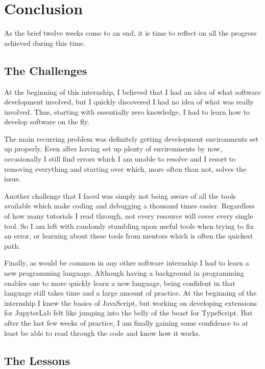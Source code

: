 \chapter{Conclusion}

    As the brief twelve weeks come to an end, it is time to reflect on all the progress achieved during this time. 


    \section*{The Challenges}

        At the beginning of this internship, I believed that I had an idea of what software development involved, but I quickly discovered I had no idea of what was really involved. Thus, starting with essentially zero knowledge, I had to learn how to develop software on the fly. 

        The main recurring problem was definitely getting development environments set up properly. Even after having set up plenty of environments by now, occasionally I still find errors which I am unable to resolve and I resort to removing everything and starting over which, more often than not, solves the issue.

        Another challenge that I faced was simply not being aware of all the tools available which make coding and debugging a thousand times easier. Regardless of how many tutorials I read through, not every resource will cover every single tool. So I am left with randomly stumbling upon useful tools when trying to fix an error, or learning about these tools from mentors which is often the quickest path.

        Finally, as would be common in any other software internship I had to learn a new programming language. Although having a background in programming enables one to more quickly learn a new language, being confident in that language still takes time and a large amount of practice. At the beginning of the internship I knew the basics of JavaScript, but working on developing extensions for JupyterLab felt like jumping into the belly of the beast for TypeScript. But after the last few weeks of practice, I am finally gaining some confidence to at least be able to read through the code and know how it works.

    \section*{The Lessons}

